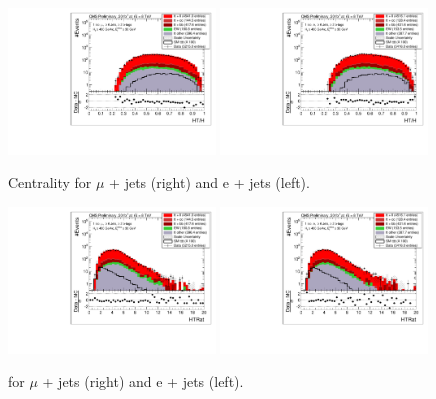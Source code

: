 \begin{figure}[!ht]
    \includegraphics[clip, trim=0.15cm 0.15cm 0.15cm 0.1cm, width=0.49\textwidth]{images/Run1/HTH_StackLogY_Mu.pdf}
    \includegraphics[clip, trim=0.15cm 0.15cm 0.15cm 0.1cm, width=0.49\textwidth]{images/Run1/HTH_StackLogY_e.pdf}
    \caption{Centrality for $\mu$ + jets (right) and e + jets (left).}
    \label{fig:centrality}
\end{figure}

\begin{figure}[!ht]
    \includegraphics[clip, trim=0.15cm 0.15cm 0.15cm 0.1cm, width=0.49\textwidth]{images/Run1/HTRat_StackLogY_Mu.pdf}
    \includegraphics[clip, trim=0.15cm 0.15cm 0.15cm 0.1cm, width=0.49\textwidth]{images/Run1/HTRat_StackLogY_e.pdf}
    \caption{\HTrat for $\mu$ + jets (right) and e + jets (left).}
    \label{fig:HTrat}
\end{figure}

